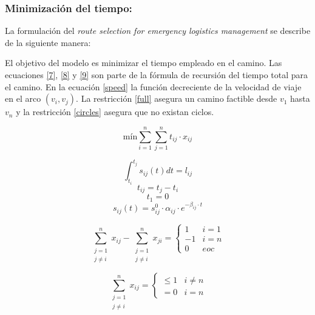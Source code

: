 \subsubsection{Minimización del tiempo:} 

La formulación del \textit{route selection for emergency logistics management} se describe de la siguiente manera:

El objetivo del modelo es minimizar el tiempo empleado en el camino. Las ecuaciones \eqref{7}, \eqref{8} y \eqref{9} son parte de la fórmula de recursión del tiempo total para el camino. En la ecuación \eqref{speed} la función decreciente de la velocidad de viaje en el arco $(v_i,v_j)$. La restricción \eqref{full} asegura un camino factible desde $v_1$ hasta $v_n$ y la restricción \eqref{circles} asegura que no existan ciclos.

\begin{equation}
	 \text{mín} \sum_{i=1}^{n}\sum_{j=1}^{n} t_{ij} \cdot x_{ij}
\end{equation}

\begin{equation}\label{7}
  \int_{t_i}^{t_j} s_{ij}(t)dt = l_{ij}
\end{equation}
\begin{equation}\label{8}
  t_{ij} = t_j - t_i
\end{equation}
\begin{equation}\label{9}
t_1 =0
\end{equation}
\begin{equation}\label{speed}
  s_{ij}(t) = s_{ij}^0 \cdot \alpha_{ij} \cdot e^{-\beta_{ij}\cdot t}
\end{equation}

\begin{equation}\label{full}
	\sum_{\substack{j=1\\
                  j \neq i}}^n x_{ij} - \sum_{\substack{j=1\\
                  j \neq i}}^{n} x_{ji} = \begin{cases}
1 & i=1\\
-1 & i=n \\
0 & eoc
\end{cases}
\end{equation}



\begin{equation}\label{circles}
	\sum_{\substack{j=1\\
                  j \neq i}}^n x_{ij} = \begin{cases}
\leq 1 & i\neq n\\
=0 & i=n 
\end{cases}
\end{equation}

